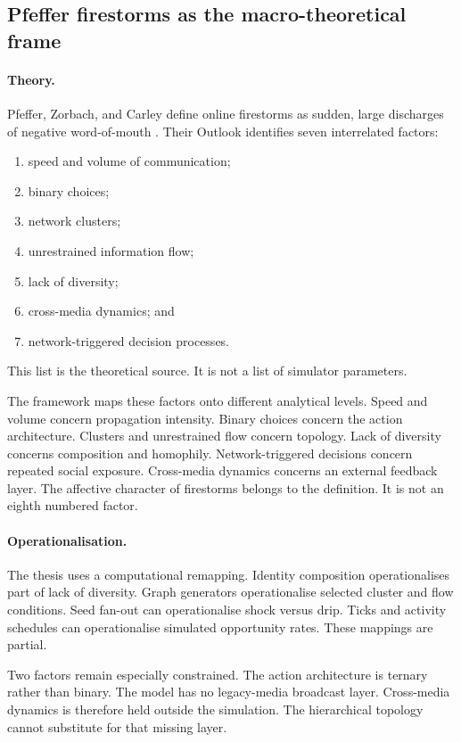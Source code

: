 \subsection{Pfeffer firestorms as the macro-theoretical frame}
\label{subsec:pfeffer-firestorms}

\paragraph{Theory.}
Pfeffer, Zorbach, and Carley define online firestorms as sudden, large discharges of negative word-of-mouth \parencite{pfeffer2014firestorms}.
Their Outlook identifies seven interrelated factors:
\begin{enumerate}
    \item speed and volume of communication;
    \item binary choices;
    \item network clusters;
    \item unrestrained information flow;
    \item lack of diversity;
    \item cross-media dynamics; and
    \item network-triggered decision processes.
\end{enumerate}
This list is the theoretical source.
It is not a list of simulator parameters.

The framework maps these factors onto different analytical levels.
Speed and volume concern propagation intensity.
Binary choices concern the action architecture.
Clusters and unrestrained flow concern topology.
Lack of diversity concerns composition and homophily.
Network-triggered decisions concern repeated social exposure.
Cross-media dynamics concerns an external feedback layer.
The affective character of firestorms belongs to the definition.
It is not an eighth numbered factor.

\paragraph{Operationalisation.}
The thesis uses a computational remapping.
Identity composition operationalises part of lack of diversity.
Graph generators operationalise selected cluster and flow conditions.
Seed fan-out can operationalise shock versus drip.
Ticks and activity schedules can operationalise simulated opportunity rates.
These mappings are partial.

Two factors remain especially constrained.
The action architecture is ternary rather than binary.
The model has no legacy-media broadcast layer.
Cross-media dynamics is therefore held outside the simulation.
The hierarchical topology cannot substitute for that missing layer.

